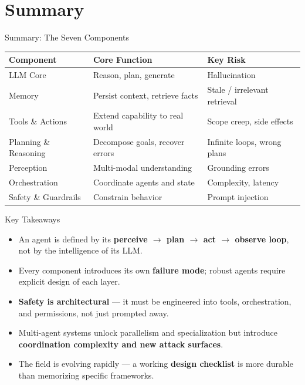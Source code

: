 \documentclass{beamer}       %
\begin{document}
\section{Summary}

\begin{frame}{Summary: The Seven Components}
    \small
    \begin{table}[]
        \centering
        \begin{tabular}{@{}lll@{}}
            \toprule
            \textbf{Component}          & \textbf{Core Function}           & \textbf{Key Risk} \\ \midrule
            LLM Core                    & Reason, plan, generate           & Hallucination \\
            Memory                      & Persist context, retrieve facts   & Stale / irrelevant retrieval \\
            Tools \& Actions            & Extend capability to real world   & Scope creep, side effects \\
            Planning \& Reasoning       & Decompose goals, recover errors   & Infinite loops, wrong plans \\
            Perception                  & Multi-modal understanding         & Grounding errors \\
            Orchestration               & Coordinate agents and state       & Complexity, latency \\
            Safety \& Guardrails        & Constrain behavior                & Prompt injection \\
            \bottomrule
        \end{tabular}
    \end{table}
\end{frame}

\begin{frame}{Key Takeaways}
    \begin{itemize}
        \item An agent is defined by its \textbf{perceive $\rightarrow$ plan $\rightarrow$ act $\rightarrow$ observe loop}, not by the intelligence of its LLM.
        \item Every component introduces its own \textbf{failure mode}; robust agents require explicit design of each layer.
        \item \textbf{Safety is architectural} --- it must be engineered into tools, orchestration, and permissions, not just prompted away.
        \item Multi-agent systems unlock parallelism and specialization but introduce \textbf{coordination complexity and new attack surfaces}.
        \item The field is evolving rapidly --- a working \textbf{design checklist} is more durable than memorizing specific frameworks.
    \end{itemize}
\end{frame}
\end{document}
